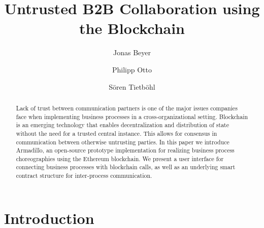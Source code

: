 \documentclass[runningheads]{llncs}
\begin{document}
%
\title{Untrusted B2B Collaboration using the Blockchain}
%
%
\author{Jonas Beyer \and
Philipp Otto\and
S\"oren Tietb\"ohl}
%
%
%
\maketitle %
%
\begin{abstract}
Lack of trust between communication partners is one of the major issues companies face when implementing business processes in a cross-organizational setting.
Blockchain is an emerging technology that enables decentralization and distribution of state without the need for a trusted central instance.
This allows for consensus in communication between otherwise untrusting parties.
In this paper we introduce Armadillo, an open-source prototype implementation for realizing business process choreographies using the Ethereum blockchain.
We present a user interface for connecting business processes with blockchain calls, as well as an underlying smart contract structure for inter-process communication.

\end{abstract}
%
%
%
\section{Introduction}




\end{document}
